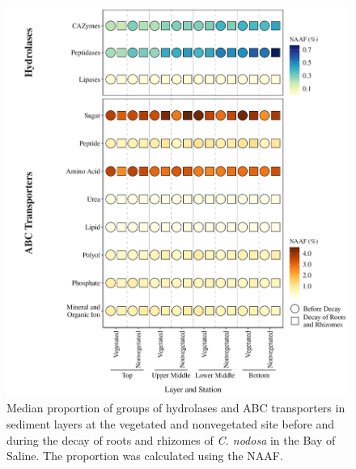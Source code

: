 \documentclass[
  12 pt,
]{article}
\begin{document}
\begin{figure}[H]

{\centering \includegraphics[width=0.9\linewidth]{../results/figures/heatmap_hydrolases_abc_transporters} 

}

\caption{Median proportion of groups of hydrolases and ABC transporters in sediment layers at the vegetated and nonvegetated site before and during the decay of roots and rhizomes of \emph{C. nodosa} in the Bay of Saline. The proportion was calculated using the NAAF.}\label{fig:heatmap-hydrolases-abc-transporters}
\end{figure}
\end{document}

